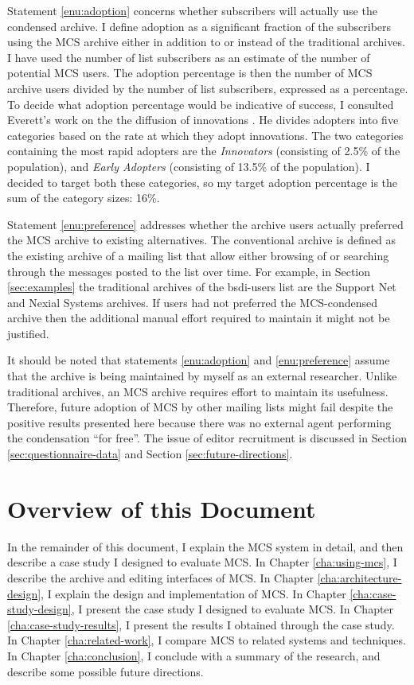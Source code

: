 Statement \ref{enu:adoption} concerns whether subscribers will actually use the
condensed archive. I define adoption as a significant fraction of the
subscribers using the MCS archive either in addition to or instead of the
traditional archives. I have used the number of list subscribers as an estimate
of the number of potential MCS users. The adoption percentage is then the
number of MCS archive users divided by the number of list subscribers,
expressed as a percentage. To decide what adoption percentage would be
indicative of success, I consulted Everett's work on the the diffusion of
innovations \cite{diffusion-innovations}. He divides adopters into five
categories based on the rate at which they adopt innovations. The two
categories containing the most rapid adopters are the {\em Innovators}
(consisting of 2.5\% of the population), and {\em Early Adopters} (consisting
of 13.5\% of the population). I decided to target both these categories, so my
target adoption percentage is the sum of the category sizes: 16\%.

Statement \ref{enu:preference} addresses whether the archive users actually
preferred the MCS archive to existing alternatives. The conventional archive is
defined as the existing archive of a mailing list that allow either browsing of
or searching through the messages posted to the list over time. For example, in
Section \ref{sec:examples} the traditional archives of the bsdi-users list are
the Support Net and Nexial Systems archives. If users had not preferred the
MCS-condensed archive then the additional manual effort required to maintain it
might not be justified.

It should be noted that statements \ref{enu:adoption} and \ref{enu:preference}
assume that the archive is being maintained by myself as an external
researcher. Unlike traditional archives, an MCS archive requires effort to
maintain its usefulness. Therefore, future adoption of MCS by other mailing
lists might fail despite the positive results presented here because there was
no external agent performing the condensation ``for free''. The issue of editor
recruitment is discussed in Section \ref{sec:questionnaire-data} and Section
\ref{sec:future-directions}.

\section{Overview of this Document}
In the remainder of this document, I explain the MCS system in detail, and then
describe a case study I designed to evaluate MCS. In Chapter
\ref{cha:using-mcs}, I describe the archive and editing interfaces of MCS.  In
Chapter \ref{cha:architecture-design}, I explain the design and implementation
of MCS. In Chapter \ref{cha:case-study-design}, I present the case study I
designed to evaluate MCS. In Chapter \ref{cha:case-study-results}, I present
the results I obtained through the case study. In Chapter
\ref{cha:related-work}, I compare MCS to related systems and techniques. In
Chapter \ref{cha:conclusion}, I conclude with a summary of the research, and
describe some possible future directions.


